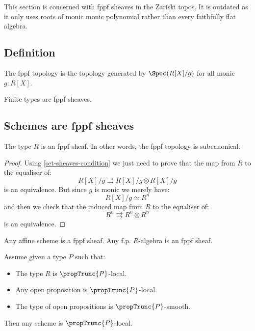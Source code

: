 This section is concerned with fppf sheaves in the Zariski topos. It is outdated as it only uses roots of monic monic polynomial rather than every faithfully flat algebra.

\subsection{Definition}

\begin{definition}
The fppf topology is the topology generated by $\Spec(R[X]/g)$ for all monic $g:R[X]$.
\end{definition}

\begin{example}
Finite types are fppf sheaves.
\end{example}

\subsection{Schemes are fppf sheaves}

\begin{lemma}\label{fppf-subcanonical}
The type $R$ is an fppf sheaf. In other words, the fppf topology is subcanonical.
\end{lemma}

\begin{proof}
Using \cref{set-sheaves-condition} we just need to prove that the map from $R$ to the equaliser of:
\[R[X]/g \rightrightarrows R[X]/g \otimes R[X]/g\]
is an equivalence. But since $g$ is monic we merely have:
\[R[X]/g \simeq R^n\]
and then we check that the induced map from $R$ to the equaliser of:
\[R^n \rightrightarrows R^n\otimes R^n\]
is an equivalence.
\end{proof}

\begin{corollary}
Any affine scheme is a fppf sheaf. Any f.p. $R$-algebra is an fppf sheaf.
\end{corollary}

\begin{lemma}\label{scheme-are-sheaf-from-affine}
Assume given a type $P$ such that:
\begin{itemize}
\item The type $R$ is $\propTrunc{P}$-local.
\item Any open proposition is $\propTrunc{P}$-local.
\item The type of open propositions is $\propTrunc{P}$-smooth.
\end{itemize}
Then any scheme is $\propTrunc{P}$-local.
\end{lemma}

